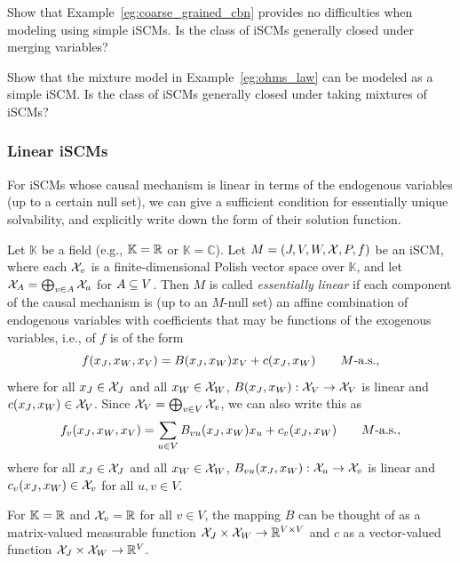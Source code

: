 \begin{Exc}
  Show that Example~\ref{eg:coarse_grained_cbn} provides no difficulties when modeling using simple iSCMs.
  Is the class of iSCMs generally closed under merging variables?
\end{Exc}

\begin{Exc}
  Show that the mixture model in Example~\ref{eg:ohms_law} can be modeled as a simple iSCM.
  Is the class of iSCMs generally closed under taking mixtures of iSCMs?
\end{Exc}

\subsubsection{Linear iSCMs}

For iSCMs whose causal mechanism is linear in terms of the endogenous variables (up to a certain null set), we can give a sufficient condition for essentially unique solvability, and explicitly write down the form of their solution function.
\begin{Def}\label{def:linear_scms}
Let $\mathbb{K}$ be a field (e.g., $\mathbb{K} = \mathbb{R}$ or $\mathbb{K} = \mathbb{C}$).
Let $M=\left ( J, V, W, \mathcal{X}, P, f \right )$ be an iSCM, where each $\mathcal{X}_v$ is a finite-dimensional Polish vector space over $\mathbb{K}$, and let $\mathcal{X}_A = \bigoplus_{v \in A} \mathcal{X}_a$ for $A \subseteq V$.
Then $M$ is called \emph{essentially linear} if each component of the causal mechanism is (up to an $M$-null set) an affine combination of endogenous variables with coefficients that may be functions of the exogenous variables, i.e., of $f$ is of the form
$$
  f(x_J,x_W,x_V) = B(x_J,x_W) x_V + c(x_J,x_W) \qquad M\text{-a.s.},
$$
where for all $x_J \in \mathcal{X}_J$ and all $x_W \in \mathcal{X}_W$, $B(x_J,x_W) : \mathcal{X}_V \to \mathcal{X}_V$ is linear and $c(x_J,x_W) \in \mathcal{X}_V$.
Since $\mathcal{X}_V = \bigoplus_{v \in V} \mathcal{X}_v$, we can also write this as
$$
  f_v(x_J,x_W,x_V) = \sum_{u\in V} B_{vu}(x_J,x_W) x_u + c_v(x_J,x_W) \qquad M\text{-a.s.},
$$
where for all $x_J \in \mathcal{X}_J$ and all $x_W \in \mathcal{X}_W$, $B_{vu}(x_J,x_W) : \mathcal{X}_u \to \mathcal{X}_v$ is linear and $c_v(x_J,x_W) \in \mathcal{X}_v$ for all $u,v \in V$.
\end{Def}
For $\mathbb{K} = \mathbb{R}$ and $\mathcal{X}_v = \mathbb{R}$ for all $v\in V$, the mapping $B$ can be thought of as a matrix-valued measurable function $\mathcal{X}_{J}\times\mathcal{X}_{W} \to \mathbb{R}^{V\times V}$ and $c$ as a vector-valued function $\mathcal{X}_{J}\times\mathcal{X}_{W} \to \mathbb{R}^V$.

